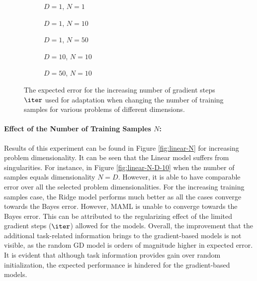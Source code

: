 \begin{figure}[h!]
  \centering
    \begin{subfigure}{0.32\textwidth}
      \centering
      \caption{$D=1$, $N=1$}
      \label{fig:linear-n_iter-N-1-D-1}
    \end{subfigure}
    \begin{subfigure}{0.32\textwidth}
      \centering
      \caption{$D=1$, $N=10$}
      \label{fig:linear-n_iter-N-10-D-1}
    \end{subfigure}
    \begin{subfigure}{0.32\textwidth}
      \centering
      \caption{$D=1$, $N=50$}
      \label{fig:linear-n_iter-N-50-D-1}
    \end{subfigure}

    \begin{subfigure}{0.32\textwidth}
      \centering
      \caption{$D=10$, $N=10$}
      \label{fig:linear-n_iter-N-10-D-10}
    \end{subfigure}
    \begin{subfigure}{0.32\textwidth}
      \centering
      \caption{$D=50$, $N=10$}
      \label{fig:linear-n_iter-N-10-D-50}
    \end{subfigure}  

  \caption{The expected error for the increasing number of gradient steps $\iter$ used for adaptation when changing the number of training samples for various problems of different dimensions.}
  \label{fig:linear-n_iter}
\end{figure}


\paragraph{Effect of the Number of Training Samples $N$:} Results of this experiment can be found in Figure \ref{fig:linear-N} for increasing problem dimensionality. It can be seen that the Linear model suffers from singularities. For instance, in Figure \ref{fig:linear-N-D-10} when the number of samples equals dimensionality $N=D$. However, it is able to have comparable error over all the selected problem dimensionalities. For the increasing training samples case, the Ridge model performs much better as all the cases converge towards the Bayes error. However, MAML is unable to converge towards the Bayes error. This can be attributed to the regularizing effect of the limited gradient steps ($\iter$) allowed for the models. Overall, the improvement that the additional task-related information brings to the gradient-based models is not visible, as the random GD model is orders of magnitude higher in expected error. It is evident that although task information provides gain over random initialization, the expected performance is hindered for the gradient-based models.

